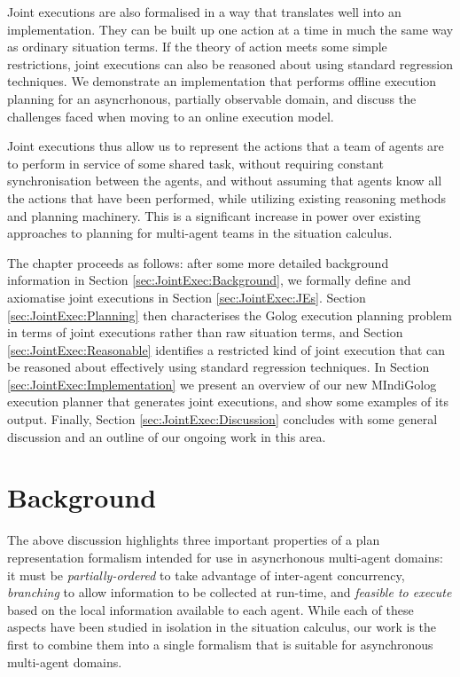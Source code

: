 Joint executions are also formalised in a way that translates well
into an implementation. They can be built up one action at a time
in much the same way as ordinary situation terms. If the theory of
action meets some simple restrictions, joint executions can also be
reasoned about using standard regression techniques. We demonstrate
an implementation that performs offline execution planning for an
asyncrhonous, partially observable domain, and discuss the challenges
faced when moving to an online execution model.

Joint executions thus allow us to represent the actions that a team
of agents are to perform in service of some shared task, without requiring
constant synchronisation between the agents, and without assuming
that agents know all the actions that have been performed, while utilizing
existing reasoning methods and planning machinery. This is a significant
increase in power over existing approaches to planning for multi-agent
teams in the situation calculus.

The chapter proceeds as follows: after some more detailed background
information in Section \ref{sec:JointExec:Background}, we formally
define and axiomatise joint executions in Section \ref{sec:JointExec:JEs}.
Section \ref{sec:JointExec:Planning} then characterises the Golog
execution planning problem in terms of joint executions rather than
raw situation terms, and Section \ref{sec:JointExec:Reasonable} identifies
a restricted kind of joint execution that can be reasoned about effectively
using standard regression techniques. In Section \ref{sec:JointExec:Implementation}
we present an overview of our new MIndiGolog execution planner that
generates joint executions, and show some examples of its output.
Finally, Section \ref{sec:JointExec:Discussion} concludes with some
general discussion and an outline of our ongoing work in this area.


\section{Background\label{sec:JointExec:Background}}

The above discussion highlights three important properties of a plan
representation formalism intended for use in asyncrhonous multi-agent
domains: it must be \emph{partially-ordered} to take advantage of
inter-agent concurrency, \emph{branching} to allow information to
be collected at run-time, and \emph{feasible to execute} based on
the local information available to each agent. While each of these
aspects have been studied in isolation in the situation calculus,
our work is the first to combine them into a single formalism that
is suitable for asynchronous multi-agent domains.



